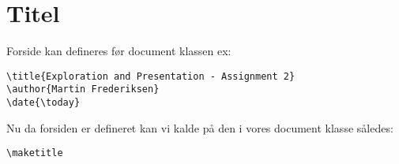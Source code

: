 \documentclass[class=report, crop=false]{standalone}
\begin{document}
    \section{Titel}
    Forside kan defineres før document klassen ex:
    \begin{tcolorbox}
        \verb|\title{Exploration and Presentation - Assignment 2}|\\
        \verb|\author{Martin Frederiksen}|\\
        \verb|\date{\today}|
    \end{tcolorbox}
    
    \noindent Nu da forsiden er defineret kan vi kalde på den i vores document klasse således:
    \begin{tcolorbox}
        \verb|\maketitle|
    \end{tcolorbox}
\end{document}
